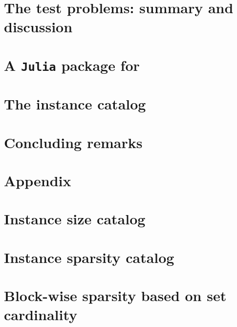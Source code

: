 	\section{The test problems: summary and discussion}\label{sec:summary}
	
	
	\section{A \texttt{Julia} package for \siplibtwo} \label{sec:package}
	
	
	\section{The instance catalog}\label{sec:instance_catalog}
	
	
	\section{Concluding remarks}\label{sec:conclusion}
	
	
	
	\appendix
	
	\section*{Appendix}
	\section{Instance size catalog} \label{sec:instance_size}
	
	
	\section{Instance sparsity catalog} \label{sec:instance_sparsity}
	
	
	\section{Block-wise sparsity based on set cardinality} \label{sec:sparsity}
	
	
